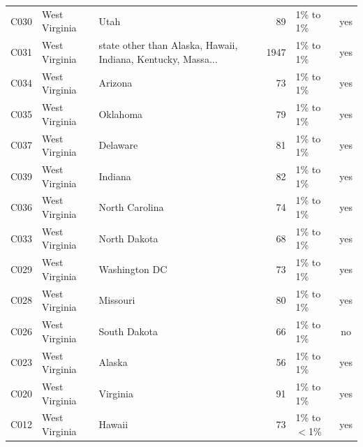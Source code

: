 \documentclass[a4paper,10pt]{article}
\newif\ifreviewmarks
\newcommand{\reviewrule}{\noindent{\color{BrickRed}\rule{\linewidth}{0.8pt}}}
\newenvironment{drafted}[1][]{%
  \ifreviewmarks\par\addvspace{\medskipamount}\reviewrule\par\nopagebreak
  \noindent{\color{BrickRed}\sffamily\footnotesize\textbf{Thesis Draft}\quad #1\hfill review}\par\nopagebreak\smallskip\fi}{%
  \ifreviewmarks\par\smallskip\noindent{\color{BrickRed}\sffamily\footnotesize end of thesis draft}\par\nopagebreak\reviewrule\par\medskip\fi}
\begin{document}
\begin{drafted}[plain-language layer: churn100-s2-c2]
{\begin{longtable}{@{}lllrlc@{}}
C030 & West Virginia & Utah & 89 & 1\% to 1\% & \textcolor{OliveGreen}{yes} \\
C031 & West Virginia & state other than Alaska, Hawaii, Indiana, Kentucky, Massa... & 1947 & 1\% to 1\% & \textcolor{OliveGreen}{yes} \\
C034 & West Virginia & Arizona & 73 & 1\% to 1\% & \textcolor{OliveGreen}{yes} \\
C035 & West Virginia & Oklahoma & 79 & 1\% to 1\% & \textcolor{OliveGreen}{yes} \\
C037 & West Virginia & Delaware & 81 & 1\% to 1\% & \textcolor{OliveGreen}{yes} \\
C039 & West Virginia & Indiana & 82 & 1\% to 1\% & \textcolor{OliveGreen}{yes} \\
C036 & West Virginia & North Carolina & 74 & 1\% to 1\% & \textcolor{OliveGreen}{yes} \\
C033 & West Virginia & North Dakota & 68 & 1\% to 1\% & \textcolor{OliveGreen}{yes} \\
C029 & West Virginia & Washington DC & 73 & 1\% to 1\% & \textcolor{OliveGreen}{yes} \\
C028 & West Virginia & Missouri & 80 & 1\% to 1\% & \textcolor{OliveGreen}{yes} \\
C026 & West Virginia & South Dakota & 66 & 1\% to 1\% & \textcolor{BrickRed}{no} \\
C023 & West Virginia & Alaska & 56 & 1\% to 1\% & \textcolor{OliveGreen}{yes} \\
C020 & West Virginia & Virginia & 91 & 1\% to 1\% & \textcolor{OliveGreen}{yes} \\
C012 & West Virginia & Hawaii & 73 & 1\% to $<$1\% & \textcolor{OliveGreen}{yes} \\
\end{longtable}}

\end{drafted}
\end{document}

